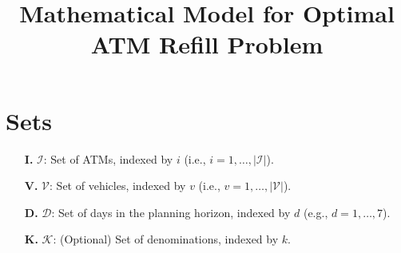 \documentclass[11pt]{article}
\begin{document}
\title{Mathematical Model for Optimal ATM Refill Problem}
\author{}
\date{}
\maketitle

\section{Sets}
\begin{itemize}[leftmargin=1.5cm]
    \item[\textbf{I.}] \(\mathcal{I}\): Set of ATMs, indexed by \(i\) (i.e., \(i=1,\dots,|\mathcal{I}|\)).
    \item[\textbf{V.}] \(\mathcal{V}\): Set of vehicles, indexed by \(v\) (i.e., \(v=1,\dots,|\mathcal{V}|\)).
    \item[\textbf{D.}] \(\mathcal{D}\): Set of days in the planning horizon, indexed by \(d\) (e.g., \(d=1,\dots,7\)).
    \item[\textbf{K.}] \(\mathcal{K}\): (Optional) Set of denominations, indexed by \(k\).
\end{itemize}
\end{document}
